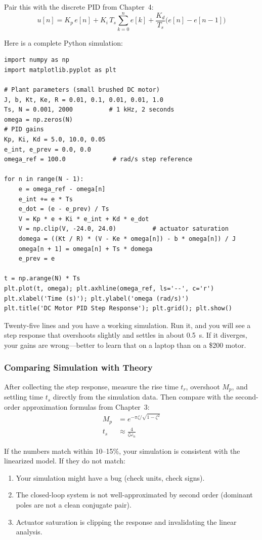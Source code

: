 Pair this with the discrete PID from Chapter~4:
\begin{equation}
u[n] = K_p\,e[n] + K_i\,T_s \sum_{k=0}^{n} e[k]
       + \frac{K_d}{T_s}\bigl(e[n] - e[n-1]\bigr)
\end{equation}

Here is a complete Python simulation:

\begin{verbatim}
import numpy as np
import matplotlib.pyplot as plt

# Plant parameters (small brushed DC motor)
J, b, Kt, Ke, R = 0.01, 0.1, 0.01, 0.01, 1.0
Ts, N = 0.001, 2000          # 1 kHz, 2 seconds
omega = np.zeros(N)
# PID gains
Kp, Ki, Kd = 5.0, 10.0, 0.05
e_int, e_prev = 0.0, 0.0
omega_ref = 100.0             # rad/s step reference

for n in range(N - 1):
    e = omega_ref - omega[n]
    e_int += e * Ts
    e_dot = (e - e_prev) / Ts
    V = Kp * e + Ki * e_int + Kd * e_dot
    V = np.clip(V, -24.0, 24.0)          # actuator saturation
    domega = ((Kt / R) * (V - Ke * omega[n]) - b * omega[n]) / J
    omega[n + 1] = omega[n] + Ts * domega
    e_prev = e

t = np.arange(N) * Ts
plt.plot(t, omega); plt.axhline(omega_ref, ls='--', c='r')
plt.xlabel('Time (s)'); plt.ylabel('omega (rad/s)')
plt.title('DC Motor PID Step Response'); plt.grid(); plt.show()
\end{verbatim}

Twenty-five lines and you have a working simulation. Run it, and you will see
a step response that overshoots slightly and settles in about 0.5~s. If it
diverges, your gains are wrong---better to learn that on a laptop than on a
\$200 motor.

\subsubsection{Comparing Simulation with Theory}

After collecting the step response, measure the rise time $t_r$, overshoot
$M_p$, and settling time $t_s$ directly from the simulation data. Then compare
with the second-order approximation formulas from Chapter~3:
\begin{align}
M_p &= e^{-\pi\zeta / \sqrt{1 - \zeta^2}} \\
t_s &\approx \frac{4}{\zeta \omega_n}
\end{align}

If the numbers match within 10--15\%, your simulation is consistent with the
linearized model. If they do not match:
\begin{enumerate}
    \item Your simulation might have a bug (check units, check signs).
    \item The closed-loop system is not well-approximated by second order
          (dominant poles are not a clean conjugate pair).
    \item Actuator saturation is clipping the response and invalidating the
          linear analysis.
\end{enumerate}

